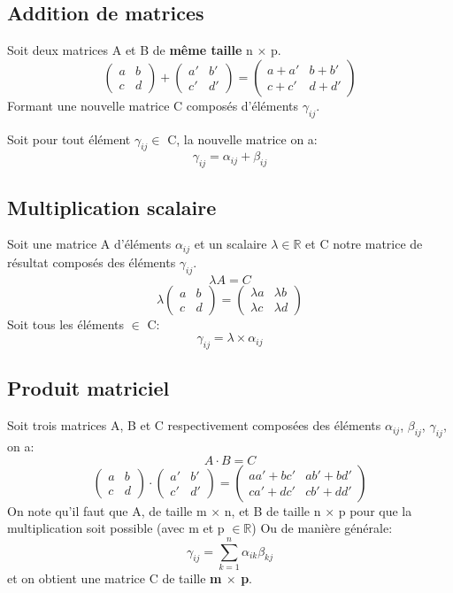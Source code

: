 \documentclass[10pt,a4paper]{book}
\newcommand{\R}{\mathbb{R}}
\newcommand{\x}{$\times$ }
\begin{document}
\subsection{Addition de matrices}

Soit deux matrices A et B de \textbf{même taille} n \x p. 
\[
\begin{pmatrix}
a & b \\
c & d
\end{pmatrix}
+
\begin{pmatrix}
a' & b' \\
c' & d'
\end{pmatrix}
=
\begin{pmatrix}
a + a' & b + b' \\
c + c' & d + d'
\end{pmatrix}
\]
Formant une nouvelle matrice C composés d'éléments $\gamma_{ij}$. \par
Soit pour tout élément $\gamma_{ij} \in$ C, la nouvelle matrice on a:
\[\gamma_{ij} = \alpha_{ij} + \beta_{ij}\]

\subsection{Multiplication scalaire}

Soit une matrice A d'éléments $\alpha_{ij}$ et un scalaire $\lambda \in \R$ et C notre matrice de résultat composés des éléments $\gamma_{ij}$.
\[\lambda A = C\]
\[\lambda
\begin{pmatrix}
a & b \\
c & d
\end{pmatrix}
=
\begin{pmatrix}
\lambda a & \lambda b \\
\lambda c & \lambda d 
\end{pmatrix}\]
Soit tous les éléments $\in$ C:
\[\gamma_{ij} = \lambda \times \alpha_{ij}\]

\subsection{Produit matriciel}
Soit trois matrices A, B et C respectivement composées des éléments $\alpha_{ij}$, $\beta_{ij}$, $\gamma_{ij}$, on a:
\[A \cdot B = C\]
\[\begin{pmatrix}
a & b \\
c & d
\end{pmatrix}
\cdot
\begin{pmatrix}
a' & b' \\
c' & d'
\end{pmatrix}
=
\begin{pmatrix}
aa' + bc'  & ab' + bd' \\
ca' + dc' & cb' + dd'
\end{pmatrix}\]
On note qu'il faut que A, de taille m \x n, et B de taille n \x p pour que la multiplication soit possible (avec m et p $\in \R$)
Ou de manière générale:
\[\gamma_{ij} = \sum_{k=1}^n \alpha_{ik} \beta_{kj}\]
et on obtient une matrice C de taille \textbf{m \x p}.
\end{document}
